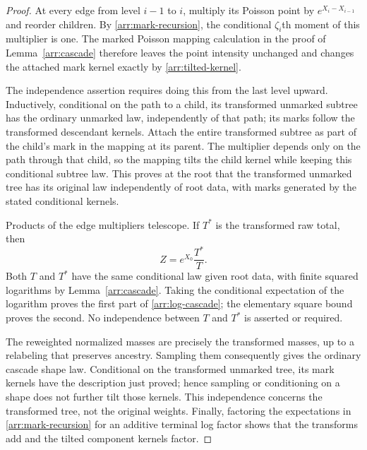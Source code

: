 \begin{proof}
At every edge from level $i-1$ to $i$, multiply its Poisson point by
$e^{X_i-X_{i-1}}$ and reorder children.  By
\eqref{arr:mark-recursion}, the conditional $\zeta_i$th moment of this
multiplier is one.  The marked Poisson mapping calculation in the proof
of Lemma~\ref{arr:cascade} therefore leaves the point intensity unchanged
and changes the attached mark kernel exactly by
\eqref{arr:tilted-kernel}.

The independence assertion requires doing this from the last level
upward.  Inductively, conditional on the path to a child, its transformed
unmarked subtree has the ordinary unmarked law, independently of that
path; its marks follow the transformed descendant kernels.  Attach the
entire transformed subtree as part of the child's mark in the mapping
at its parent.  The multiplier depends only on the path through that
child, so the mapping tilts the child kernel while keeping this
conditional subtree law.  This proves at the root that the transformed
unmarked tree has its original law independently of root data, with
marks generated by the stated conditional kernels.

Products of the edge multipliers telescope.  If $T^*$ is the transformed
raw total, then
\begin{equation}
 Z=e^{X_0}\frac{T^*}{T}.
 \label{arr:raw-total-ratio}
\end{equation}
Both $T$ and $T^*$ have the same conditional law given root data, with
finite squared logarithms by Lemma~\ref{arr:cascade}.  Taking the
conditional expectation of the logarithm proves the first part of
\eqref{arr:log-cascade}; the elementary square bound proves the second.
No independence between $T$ and $T^*$ is asserted or required.

The reweighted normalized masses are precisely the transformed masses,
up to a relabeling that preserves ancestry.  Sampling them consequently
gives the ordinary cascade shape law.  Conditional on the transformed
unmarked tree, its mark kernels have the description just proved; hence
sampling or conditioning on a shape does not further tilt those kernels.
This independence concerns the transformed tree, not the original
weights.  Finally, factoring the expectations in
\eqref{arr:mark-recursion} for an additive terminal log factor shows that
the transforms add and the tilted component kernels factor.
\end{proof}

